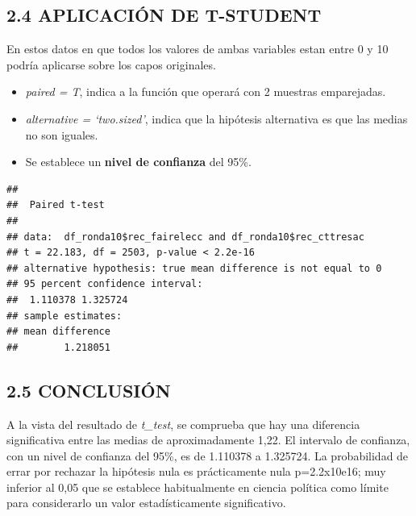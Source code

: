 \documentclass[
  12 pt,
  a4paper,
]{article}
\newenvironment{Shaded}{\begin{snugshade}}{\end{snugshade}}
\newcommand{\AttributeTok}[1]{\textcolor[rgb]{0.13,0.29,0.53}{#1}}
\newcommand{\DecValTok}[1]{\textcolor[rgb]{0.00,0.00,0.81}{#1}}
\newcommand{\FunctionTok}[1]{\textcolor[rgb]{0.13,0.29,0.53}{\textbf{#1}}}
\newcommand{\NormalTok}[1]{#1}
\newcommand{\SpecialCharTok}[1]{\textcolor[rgb]{0.81,0.36,0.00}{\textbf{#1}}}
\newcommand{\StringTok}[1]{\textcolor[rgb]{0.31,0.60,0.02}{#1}}
\begin{document}
\subsection{2.4 APLICACIÓN DE
T-STUDENT}\label{aplicaciuxf3n-de-t-student}

En estos datos en que todos los valores de ambas variables estan entre 0
y 10 podría aplicarse sobre los capos originales.

\begin{itemize}
\item
  \emph{paired = T}, indica a la función que operará con 2 muestras
  emparejadas.
\item
  \emph{alternative = `two.sized'}, indica que la hipótesis alternativa
  es que las medias no son iguales.
\item
  Se establece un \textbf{nivel de confianza} del 95\%.
\end{itemize}

\begin{Shaded}
\end{Shaded}

\begin{verbatim}
## 
##  Paired t-test
## 
## data:  df_ronda10$rec_fairelecc and df_ronda10$rec_cttresac
## t = 22.183, df = 2503, p-value < 2.2e-16
## alternative hypothesis: true mean difference is not equal to 0
## 95 percent confidence interval:
##  1.110378 1.325724
## sample estimates:
## mean difference 
##        1.218051
\end{verbatim}

\subsection{2.5 CONCLUSIÓN}\label{conclusiuxf3n}

A la vista del resultado de \emph{t\_test}, se comprueba que hay una
diferencia significativa entre las medias de aproximadamente 1,22. El
intervalo de confianza, con un nivel de confianza del 95\%, es de
1.110378 a 1.325724. La probabilidad de errar por rechazar la hipótesis
nula es prácticamente nula p=2.2x10e16; muy inferior al 0,05 que se
establece habitualmente en ciencia política como límite para
considerarlo un valor estadísticamente significativo.
\end{document}
